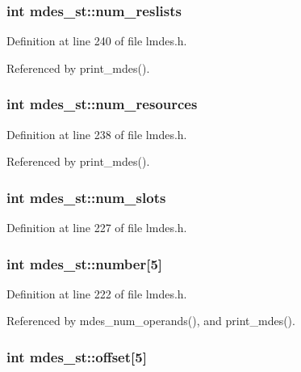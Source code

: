 \subsubsection{\setlength{\rightskip}{0pt plus 5cm}int \bf{mdes\_\-st::num\_\-reslists}}\label{structmdes__st_1d5ecc9d3fa408ec56becadbbd3be2aa}




Definition at line 240 of file lmdes.h.

Referenced by print\_\-mdes().
\subsubsection{\setlength{\rightskip}{0pt plus 5cm}int \bf{mdes\_\-st::num\_\-resources}}\label{structmdes__st_cf06ff3643ff3e4d0d0a4e8ba8422149}




Definition at line 238 of file lmdes.h.

Referenced by print\_\-mdes().
\subsubsection{\setlength{\rightskip}{0pt plus 5cm}int \bf{mdes\_\-st::num\_\-slots}}\label{structmdes__st_c586c61ba65b9cf1f47c3958a8733221}




Definition at line 227 of file lmdes.h.
\subsubsection{\setlength{\rightskip}{0pt plus 5cm}int \bf{mdes\_\-st::number}[5]}\label{structmdes__st_c34628a21ebb2f399adb56922b09d17c}




Definition at line 222 of file lmdes.h.

Referenced by mdes\_\-num\_\-operands(), and print\_\-mdes().
\subsubsection{\setlength{\rightskip}{0pt plus 5cm}int \bf{mdes\_\-st::offset}[5]}\label{structmdes__st_35702b33712810e42a62051cd83a0649}




